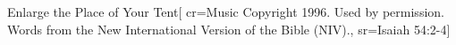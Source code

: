 {Enlarge the Place of Your Tent}[
    cr={Music Copyright 1996.  Used by permission.  Words from the New International Version of the Bible (NIV).},
    sr={Isaiah 54:2-4}]
